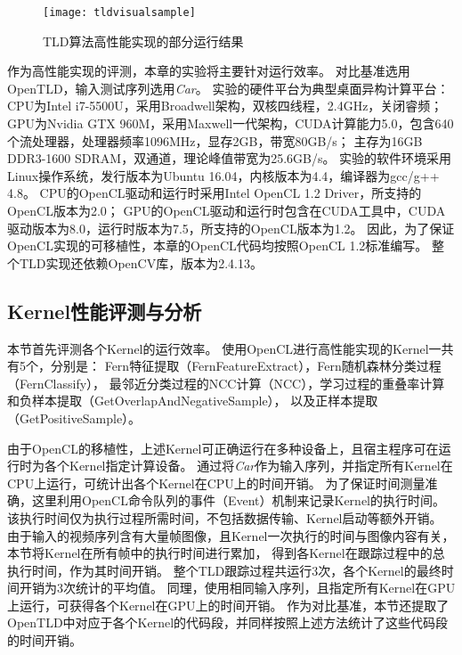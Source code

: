 \begin{figure}[htb]
  \centering
  \texttt{[image: tldvisualsample]}
  \caption{TLD算法高性能实现的部分运行结果}
  \label{tldvisualsample}
\end{figure}

作为高性能实现的评测，本章的实验将主要针对运行效率。
对比基准选用OpenTLD，输入测试序列选用\textit{Car}。
实验的硬件平台为典型桌面异构计算平台：CPU为Intel i7-5500U，采用Broadwell架构，双核四线程，2.4GHz，关闭睿频；
GPU为Nvidia GTX 960M，采用Maxwell一代架构，CUDA计算能力5.0，包含640个流处理器，处理器频率1096MHz，显存2GB，带宽80GB/s；
主存为16GB DDR3-1600 SDRAM，双通道，理论峰值带宽为25.6GB/s。
实验的软件环境采用Linux操作系统，发行版本为Ubuntu 16.04，内核版本为4.4，编译器为gcc/g++ 4.8。
CPU的OpenCL驱动和运行时采用Intel OpenCL 1.2 Driver，所支持的OpenCL版本为2.0；
GPU的OpenCL驱动和运行时包含在CUDA工具中，CUDA驱动版本为8.0，运行时版本为7.5，所支持的OpenCL版本为1.2。
因此，为了保证OpenCL实现的可移植性，本章的OpenCL代码均按照OpenCL 1.2标准编写。
整个TLD实现还依赖OpenCV库，版本为2.4.13。

\subsection{Kernel性能评测与分析}
本节首先评测各个Kernel的运行效率。
使用OpenCL进行高性能实现的Kernel一共有5个，分别是：
Fern特征提取（FernFeatureExtract），Fern随机森林分类过程（FernClassify），
最邻近分类过程的NCC计算（NCC），学习过程的重叠率计算和负样本提取（GetOverlapAndNegativeSample），
以及正样本提取（GetPositiveSample）。

由于OpenCL的移植性，上述Kernel可正确运行在多种设备上，且宿主程序可在运行时为各个Kernel指定计算设备。
通过将\textit{Car}作为输入序列，并指定所有Kernel在CPU上运行，可统计出各个Kernel在CPU上的时间开销。
为了保证时间测量准确，这里利用OpenCL命令队列的事件（Event）机制来记录Kernel的执行时间。
该执行时间仅为执行过程所需时间，不包括数据传输、Kernel启动等额外开销。
由于输入的视频序列含有大量帧图像，且Kernel一次执行的时间与图像内容有关，本节将Kernel在所有帧中的执行时间进行累加，
得到各Kernel在跟踪过程中的总执行时间，作为其时间开销。
整个TLD跟踪过程共运行3次，各个Kernel的最终时间开销为3次统计的平均值。
同理，使用相同输入序列，且指定所有Kernel在GPU上运行，可获得各个Kernel在GPU上的时间开销。
作为对比基准，本节还提取了OpenTLD中对应于各个Kernel的代码段，并同样按照上述方法统计了这些代码段的时间开销。

